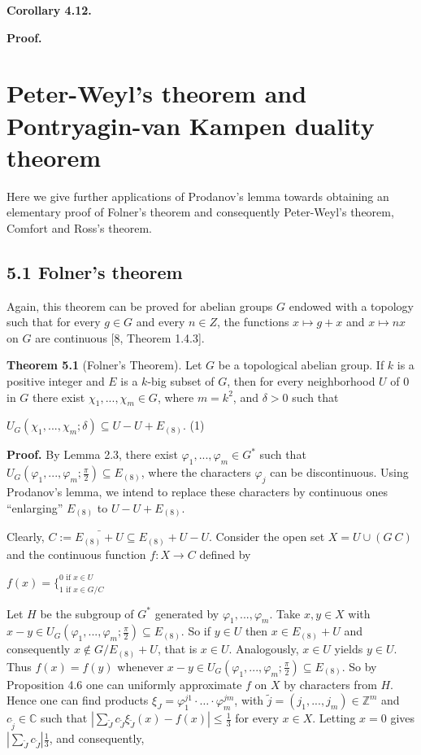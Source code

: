 \documentclass[12pt]{article}
\begin{document}
\textbf{Corollary 4.12.}


\textbf{Proof.}


\section{Peter-Weyl's theorem and Pontryagin-van Kampen duality theorem}


    Here we give further applications of Prodanov's lemma towards obtaining an elementary proof of Folner's theorem and
consequently Peter-Weyl's theorem, Comfort and Ross's theorem.


\subsection{5.1 Folner's theorem}


    Again, this theorem can be proved for abelian groups $G$ endowed with a topology such that for every $g \in G$ and every
$n \in Z$, the functions $x \mapsto g + x$ and $x \mapsto nx$ on $G$ are continuous [8, Theorem 1.4.3].


\textbf{Theorem 5.1} (Folner's Theorem). Let $G$ be a topological abelian group. If $k$ is a positive integer and $E$ is a $k$-big subset of $G$, then for
every neighborhood $U$ of 0 in $G$ there exist $\chi_1,...,\chi_m \in G$, where $m = k^2$, and $\delta > 0$ such that


    $U_G(\chi_1,...,\chi_m; \delta) \subseteq U - U + E_{(8)}$.  (1)


\textbf{Proof.} By Lemma 2.3, there exist $\varphi_1,...,\varphi_m \in G^*$ such that $U_G(\varphi_1,...,\varphi_m; \frac{\pi}{2} ) \subseteq E_{(8)}$, where the characters $\varphi_j$ can be
discontinuous. Using Prodanov's lemma, we intend to replace these characters by continuous ones “enlarging” $E_{(8)}$ to
$U - U + E_{(8)}$.


    Clearly, $C := \bar{E_{(8)} + U }\subseteq E_{(8)} + U - U$. Consider the open set $X = U \cup (G \ C)$ and the continuous function $f : X \to C$
defined by


    $f(x) = \{^{0 \text{ if } x \in U}_{1 \text{ if } x \in G / C} $


    Let $H$ be the subgroup of $G^*$ generated by $\varphi_1,...,\varphi_m$. Take $x, y \in X$ with $x - y \in U_G(\varphi_1,...,\varphi_m; \frac{\pi}{2} ) \subseteq E_{(8)}$. So if $y \in U$ then
$x \in E_{(8)} + U$ and consequently $x \notin G / E_{(8)} + U$, that is $x \in U$. Analogously, $x \in U$ yields $y \in U$. Thus $f(x) = f(y)$ whenever
$x - y \in U_G(\varphi_1,...,\varphi_m; \frac{\pi}{2} ) \subseteq E_{(8)}$. So by Proposition 4.6 one can uniformly approximate $f$ on $X$ by characters from $H$. Hence
one can find products $\xi_J = \varphi^{j1}_1 · \dots · \varphi^{jm}_m$, with $\tilde{j} = (j_1,..., j_m) \in \mathbb{Z}^m$ and $c_{\tilde{j}} \in \mathbb{C}$ such that $|\sum_{\tilde{J}} c_{\tilde{J}} \xi_{\tilde{J}}(x) - f(x)| \leqslant \frac{1}{3}$ for every
$x \in X$. Letting $x = 0$ gives $|\sum_{\tilde{J}} c_{\tilde{J}}|  \frac{1}{3}$, and consequently,
\end{document}
